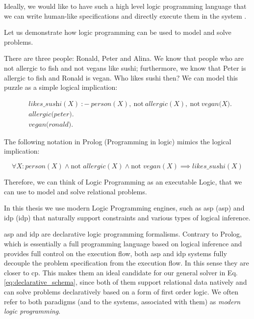 Ideally, we would like to have such a high level logic programming language that we can write human-like specifications and directly execute them in the system \parencite{denecker}.
\pubrevend

Let us demonstrate how logic programming can be used to model and solve problems. 
\begin{example}
There are three people: Ronald, Peter and
Alina. We know that people who are not allergic to fish and not vegans like sushi; 
furthermore, we know that Peter is allergic to fish and Ronald is
    vegan. 
Who likes sushi then? We can model this puzzle as a
simple logical implication:

\begin{equation*}
    \begin{aligned}
& \textit{likes\_sushi}(X)~{:}{-}~\textit{person}(X),~\text{not}~
        \textit{allergic}(X), ~\text{not}~\textit{vegan(X)}. \\
&       \textit{allergic(peter)}. \\
&       \textit{vegan(ronald)}.
    \end{aligned}
\end{equation*}

The following notation in Prolog (Programming in logic)
\parencite{birth_of_prolog} mimics the logical implication:

\begin{equation}\label{eq:sushi}
  \forall X: \textit{person}(X) \wedge \text{not }
    \textit{allergic}(X) \wedge \text{not } \textit{vegan}(X)
  \implies \textit{likes\_sushi}(X)
\end{equation}
\end{example}
Therefore, we can think of Logic Programming as an executable Logic, that
we can use to model and solve relational problems.

In this thesis we use modern Logic Programming engines, such
as \acrlong{asp} (\acrshort{asp}) \parencite{ASPbook,whatisasp} and
\acrlong{idp} (\acrshort{idp})
\parencite{idp} %
that naturally support constraints and various types of logical
inference.

\pubrev
\acrshort{asp} and \acrshort{idp} are declarative logic programming
formalisms. Contrary to Prolog, which is essentially a full
programming language based on logical inference and provides full
control on the execution flow,  both \acrshort{asp} and \acrshort{idp}
systems fully decouple the problem specification from the execution
flow. In this sense they are closer to \acrlong{cp}. This makes them
an ideal candidate for our general solver in Eq. 
\ref{eq:declarative_schema}, since both of them support relational
data natively and can solve problems declaratively based on a form of
first order logic. We often refer to both paradigms (and to the systems,
associated with them) as \textit{modern logic programming}.

